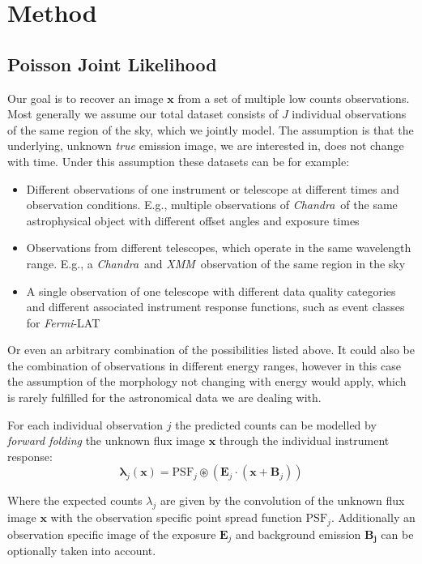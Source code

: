 \documentclass[twocolumn]{aastex631}
\newcommand{\chandra}{\textit{Chandra}~}
\newcommand{\xmm}{\textit{XMM}~}
\newcommand{\fermi}{\textit{Fermi}-LAT~}
\begin{document}
    \section{Method}
    \subsection{Poisson Joint Likelihood}
    Our goal is to recover an image $\mathbf{x}$ from a set of multiple low counts observations. Most generally we assume our total dataset consists of $J$ individual observations of the same region of the sky, which we jointly model. The assumption is that the underlying, unknown \textit{true} emission image, we are interested in, does not change with time. Under this assumption these datasets can be for example:

    \begin{itemize}
        \item Different observations of one instrument or telescope at different times and observation conditions. E.g., multiple observations of \chandra of the same astrophysical object with different offset angles and exposure times
        \item Observations from different telescopes, which operate in the same wavelength range. E.g., a \chandra and \xmm observation of the same region in the sky
        \item A single observation of one telescope with different data quality categories and different associated instrument response functions, such as event classes for \fermi
    \end{itemize}

    Or even an arbitrary combination of the possibilities listed above. It could also be the combination of observations in different energy ranges, however in this case the assumption of the morphology not changing with energy would apply, which is rarely fulfilled for the astronomical data we are dealing with.
    
    For each individual observation $j$ the predicted counts can be modelled by \textit{forward folding} the unknown flux image $\mathbf{x}$ through the individual instrument response:
    \begin{equation}
        \label{eq:model}
        \boldsymbol{\lambda}_j(\mathbf{x}) = \mathrm{PSF}_j \circledast \left(\mathbf{E}_j \cdot (\mathbf{x} + \mathbf{B}_j) \right)
    \end{equation}

    Where the expected counts $\lambda_j$ are given by the convolution of the unknown 
    flux image $\mathbf{x}$ with the observation specific point spread function $\mathrm{PSF}_j$. Additionally
    an observation specific image of the exposure $\mathbf{E}_j$ and background emission $\mathbf{B_j}$ can be
    optionally taken into account.
\end{document}
